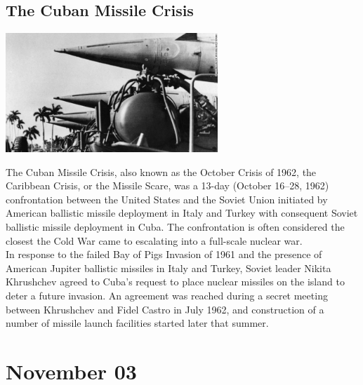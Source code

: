 \documentclass[11pt]{report}
\begin{document}
\subsection{The Cuban Missile Crisis}
\vspace{2mm}\begin{center}\includegraphics[width=8cm]{./img/cubaMissileCsis.jpg}\end{center}
The Cuban Missile Crisis, also known as the October Crisis of 1962, the Caribbean Crisis, or the Missile Scare, was a 13-day (October 16–28, 1962) confrontation between the United States and the Soviet Union initiated by American ballistic missile deployment in Italy and Turkey with consequent Soviet ballistic missile deployment in Cuba. The confrontation is often considered the closest the Cold War came to escalating into a full-scale nuclear war.\\
\indent In response to the failed Bay of Pigs Invasion of 1961 and the presence of American Jupiter ballistic missiles in Italy and Turkey, Soviet leader Nikita Khrushchev agreed to Cuba's request to place nuclear missiles on the island to deter a future invasion. An agreement was reached during a secret meeting between Khrushchev and Fidel Castro in July 1962, and construction of a number of missile launch facilities started later that summer.
\section{November 03}
\end{document}
